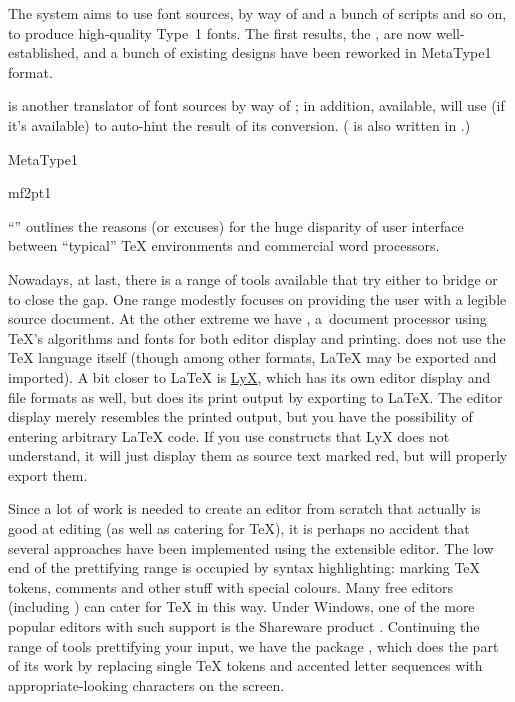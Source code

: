 The  system aims to use \MF{} font sources, by way
of \MP{} and a bunch of scripts and so on, to produce high-quality
Type~1 fonts.  The first results, the %
, are now
well-established, and a bunch of existing designs have been reworked
in MetaType1 format.

 is another translator of \MF{} font sources by way of
\MP{}; in addition,
available,  will use
\href{http://fontforge.sourceforge.net/}{} (if it's
available) to auto-hint the result of its conversion.
( is also written in .)
\begin{ctanrefs}
\item[MetaType1]
\item[mf2pt1]
\end{ctanrefs}


``''
outlines the reasons (or excuses) for the huge disparity of user
interface between ``typical'' \TeX{} environments and commercial word
processors.

Nowadays, at last, there is a range of tools available that try either
to bridge or to close the gap.  One range modestly focuses on
providing the user with a legible source document.  At the other
extreme we have \href{http://www.texmacs.org}{},
a~document processor using
\TeX{}'s algorithms and fonts for both editor display and printing.
 does not use the \TeX{}
language itself (though among other formats, \LaTeX{} may be exported
and imported).  A bit closer to \LaTeX{} is
\href{http://www.lyx.org/}{LyX}, which has its own
editor display and file formats as well, but does its print output by
exporting to \LaTeX{}.  The editor display merely resembles the
printed output, but you have the possibility of entering arbitrary
\LaTeX{} code.  If you use constructs that LyX does not
understand, it will just display them as source text marked red, but
will properly export them.

Since a lot of work is needed to create an editor from scratch that
actually is good at editing (as well as catering for \TeX{}), it is
perhaps no accident that several approaches have been implemented
using the extensible  editor.  The low end of the
prettifying range is occupied by syntax highlighting: marking \TeX{}
tokens, comments and other stuff with special colours.
Many free editors (including ) can cater for \TeX{} in
this way.  Under Windows, one of the more popular editors with such
support is the
Shareware product \href{http://www.winedt.com/}{}.
Continuing the range of
tools prettifying your input, we have the  package
\href{http://x-symbol.sourceforge.net}{}, which does
the \WYSIWYG{} part of its work by replacing single \TeX{} tokens and
accented letter sequences with appropriate-looking characters on the
screen.

